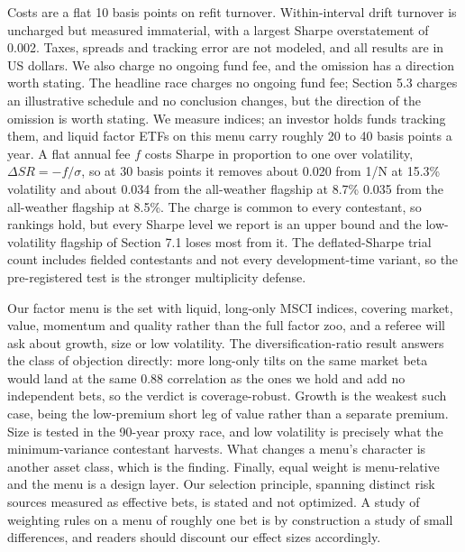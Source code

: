 \documentclass[12pt,letterpaper]{article}
\newcommand{\quita}[1]{{\color{quitarc}#1}}
\newcommand{\nuevo}[1]{{\color{nuevoc}#1}}
\begin{document}
Costs are a flat 10 basis points on refit turnover. Within-interval drift turnover
is uncharged but measured immaterial, with a largest Sharpe overstatement of
0.002. Taxes, spreads and tracking error are not modeled, and all results are in
US dollars. \quita{We also charge no ongoing fund fee, and the omission has a direction worth stating.} \nuevo{The headline race charges no ongoing fund fee; Section 5.3 charges an illustrative schedule and no conclusion changes, but the direction of the omission is worth stating.} We measure indices; an investor holds funds tracking
them, and liquid factor ETFs on this menu carry roughly 20 to 40 basis points a
year. A flat annual fee $f$ costs Sharpe in proportion to one over volatility,
$\Delta SR = -f/\sigma$, so at 30 basis points it removes about 0.020 from 1/N at 15.3\%
volatility and about \quita{0.034 from the all-weather flagship at 8.7\%} \nuevo{0.035 from the all-weather flagship at 8.5\%}. The charge is common to every
contestant, so rankings hold, but every Sharpe level we report is an upper bound
and the low-volatility flagship of Section 7.1 loses most from it. The
deflated-Sharpe trial count includes fielded contestants and not every
development-time variant, so the pre-registered test is the stronger multiplicity
defense.

Our factor menu is the set with liquid, long-only MSCI indices, covering market,
value, momentum and quality rather than the full factor zoo, and a referee will
ask about growth, size or low volatility. The diversification-ratio result answers
the class of objection directly: more long-only tilts on the same market beta
would land at the same 0.88 correlation as the ones we hold and add no independent
bets, so the verdict is coverage-robust. Growth is the weakest such case, being
the low-premium short leg of value rather than a separate premium. Size is tested
in the 90-year proxy race, and low volatility is precisely what the
minimum-variance contestant harvests. What changes a menu's character is another
asset class, which is the finding. Finally, equal weight is menu-relative and the
menu is a design layer. Our selection principle, spanning distinct risk sources
measured as effective bets, is stated and not optimized. A study of weighting
rules on a menu of roughly one bet is by construction a study of small
differences, and readers should discount our effect sizes accordingly.
\end{document}
